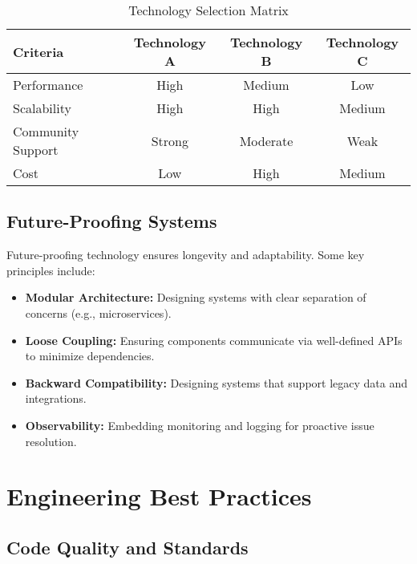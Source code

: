 \begin{table}[ht]
    \centering
    \begin{tabular}{|l|c|c|c|}
        \hline
        \textbf{Criteria} & \textbf{Technology A} & \textbf{Technology B} & \textbf{Technology C} \\
        \hline
        Performance       & High                  & Medium                & Low                   \\
        Scalability       & High                  & High                  & Medium                \\
        Community Support & Strong                & Moderate              & Weak                  \\
        Cost              & Low                   & High                  & Medium                \\
        \hline
    \end{tabular}
    \caption{Technology Selection Matrix}
    \label{tab:tech_selection}
\end{table}

\subsection{Future-Proofing Systems}

Future-proofing technology ensures longevity and adaptability. Some key principles include:

\begin{itemize}
    \item \textbf{Modular Architecture:} Designing systems with clear separation of concerns (e.g., microservices).
    \item \textbf{Loose Coupling:} Ensuring components communicate via well-defined APIs to minimize dependencies.
    \item \textbf{Backward Compatibility:} Designing systems that support legacy data and integrations.
    \item \textbf{Observability:} Embedding monitoring and logging for proactive issue resolution.
\end{itemize}

\section{Engineering Best Practices}

\subsection{Code Quality and Standards}

